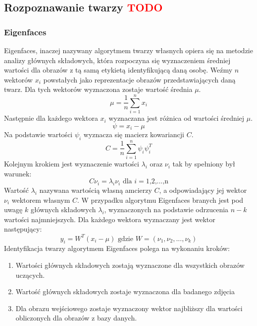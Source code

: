 \subsection{Rozpoznawanie twarzy \textcolor{red}{TODO}}
\subsubsection{Eigenfaces} \label{eigen}
Eigenfaces, inaczej nazywany algorytmem twarzy własnych opiera się na metodzie analizy głównych składowych, która rozpoczyna się wyznaczeniem średniej wartości dla obrazów z tą samą etykietą identyfikującą daną osobę.
Weźmy $n$ wektorów $x_{i}$ powstałych jako reprezentacje obrazów przedstawiających daną twarz. Dla tych wektorów wyznaczona zostaje wartość średnia $\mu$.
$$
\mu=\frac{1}{n}\sum_{i=1}^{n}x_{i}
$$
Następnie dla każdego wektora $x_{i}$ wyznaczana jest różnica od wartości średniej $\mu$.
$$
\psi= x_{i}-\mu
$$
Na podstawie wartości $\psi_{i}$ wyznacza się macierz kowariancji $C$.
$$
C=\frac{1}{n}\sum_{i=1}^{n}\psi_{i}\psi_{i}^{T}
$$
Kolejnym krokiem jest wyznaczenie wartości $\lambda_{i}$ oraz $\nu_{i}$ tak by spełniony był warunek:
$$
C\nu_{i}=\lambda_{i}\nu_{i} \textrm{ dla $i=$1,2,...,n}
$$
Wartość $\lambda_{i}$ nazywana wartością własną amcierzy $C$, a odpowiadający jej wektor $\nu_{i}$ wektorem własnym $C$.
W przypadku algorytmu Eigenfaces branych jest pod uwagę $k$ głównych składowych $\lambda_{i}$, wyznaczonych na podstawie odrzucenia $n-k$ wartości najmniejszych. Dla każdego wektora wyznaczany jest wektor następujący:
$$
y_{i}=W^{T}(x_{i}-\mu) \textrm{ gdzie $W=(\nu_{1}, \nu_{2}, ..., \nu_{k})$}
$$
Identyfikacja twarzy algorytmem Eigenfaces polega na wykonaniu kroków:
\begin{enumerate}
\item Wartości głównych składowych zostają wyznaczone dla wszystkich obrazów uczących.
\item Wartość głównych składowych zostaje wyznaczona dla badanego zdjęcia
\item Dla obrazu wejściowego zostaje wyznaczony wektor najbliższy dla wartości obliczonych dla obrazów z bazy danych.
\end{enumerate}

